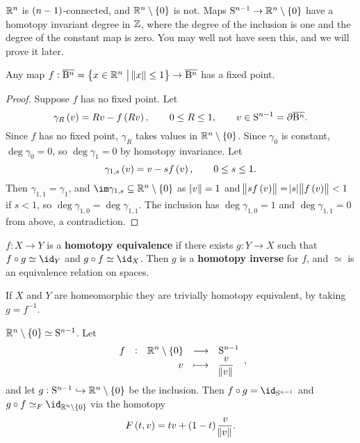 \begin{example*}
$ \mathbb{R}^n $ is $ \br{n - 1} $-connected, and $ \RR^n \setminus \cbr{0} $ is not. Maps $ \S^{n - 1} \to \RR^n \setminus \cbr{0} $ have a homotopy invariant degree in $ \mathbb{Z} $, where the degree of the inclusion is one and the degree of the constant map is zero. You may well not have seen this, and we will prove it later.
\end{example*}

\pagebreak

\begin{corollary}
Any map $ f : \overline{\B^n} = \cbr{x \in \RR^n \st \norm{x} \le 1} \to \overline{\B^n} $ has a fixed point.
\end{corollary}

\begin{proof}
Suppose $ f $ has no fixed point. Let
$$ \gamma_R\br{v} = Rv - f\br{Rv}, \qquad 0 \le R \le 1, \qquad v \in \S^{n - 1} = \da\overline{\B^n}. $$
Since $ f $ has no fixed point, $ \gamma_R $ takes values in $ \RR^n \setminus \cbr{0} $. Since $ \gamma_0 $ is constant, $ \deg \gamma_0 = 0 $, so $ \deg \gamma_1 = 0 $ by homotopy invariance. Let
$$ \gamma_{1, s}\br{v} = v - sf\br{v}, \qquad 0 \le s \le 1. $$
Then $ \gamma_{1, 1} = \gamma_1 $, and $ \im \gamma_{1, s} \subseteq \RR^n \setminus \cbr{0} $ as $ \norm{v} = 1 $ and $ \norm{sf\br{v}} = \abs{s}\norm{f\br{v}} < 1 $ if $ s < 1 $, so $ \deg \gamma_{1, 0} = \deg \gamma_{1, 1} $. The inclusion has $ \deg \gamma_{1, 0} = 1 $ and $ \deg \gamma_{1, 1} = 0 $ from above, a contradiction.
\end{proof}

\begin{definition*}
$ f : X \to Y $ is a \textbf{homotopy equivalence} if there exists $ g : Y \to X $ such that $ f \circ g \simeq \id_Y $ and $ g \circ f \simeq \id_X $. Then $ g $ is a \textbf{homotopy inverse} for $ f $, and $ \simeq $ is an equivalence relation on spaces.
\end{definition*}

\begin{example*}
If $ X $ and $ Y $ are homeomorphic they are trivially homotopy equivalent, by taking $ g = f^{-1} $.
\end{example*}

\begin{example*}
$ \RR^n \setminus \cbr{0} \simeq \S^{n - 1} $. Let
$$ \function[f]{\RR^n \setminus \cbr{0}}{\S^{n - 1}}{v}{\dfrac{v}{\norm{v}}}, $$
and let $ g : \S^{n - 1} \hookrightarrow \RR^n \setminus \cbr{0} $ be the inclusion. Then $ f \circ g = \id_{\S^{n - 1}} $ and $ g \circ f \simeq_F \id_{\RR^n \setminus \cbr{0}} $ via the homotopy
$$ F\br{t, v} = tv + \br{1 - t}\dfrac{v}{\norm{v}}. $$
\end{example*}

